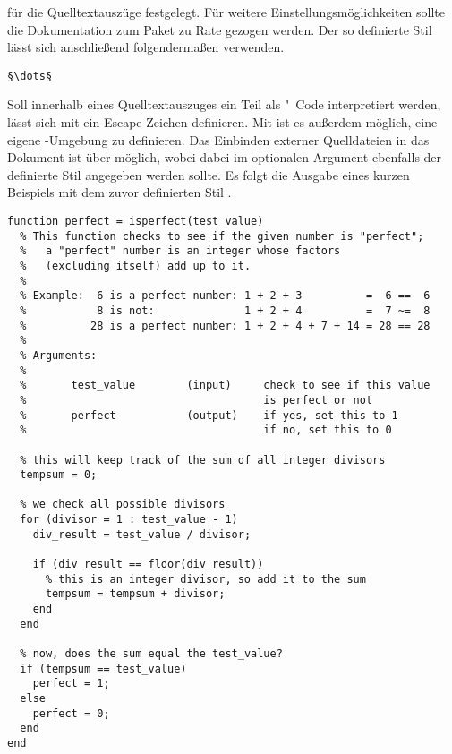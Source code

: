 \documentclass[%
  english,ngerman,%
  cdgeometry=no,DIV=12,automark,%
]{tudscrartcl}
\begin{document}
für die Quelltextauszüge festgelegt. Für weitere Einstellungsmöglichkeiten 
sollte die Dokumentation zum Paket zu Rate gezogen werden. Der so definierte 
Stil lässt sich anschließend folgendermaßen verwenden.
%
\begin{Hint}
\begin{lstlisting}[style=matlab]
§\dots§
\end{lstlisting}
\end{Hint}
%
Soll innerhalb eines Quelltextauszuges ein Teil als "~Code 
interpretiert werden, lässt sich mit  ein Escape-Zeichen 
definieren. Mit  ist es außerdem möglich, eine eigene 
-Umgebung zu definieren. Das Einbinden externer Quelldateien 
in das Dokument ist über 
möglich, wobei dabei im optionalen Argument ebenfalls der definierte Stil 
angegeben werden sollte. Es folgt die Ausgabe eines kurzen Beispiels mit dem 
zuvor definierten Stil .
%
\begin{lstlisting}[style=matlab]
function perfect = isperfect(test_value)
  % This function checks to see if the given number is "perfect";
  %   a "perfect" number is an integer whose factors 
  %   (excluding itself) add up to it.
  %
  % Example:  6 is a perfect number: 1 + 2 + 3          =  6 ==  6
  %           8 is not:              1 + 2 + 4          =  7 ~=  8
  %          28 is a perfect number: 1 + 2 + 4 + 7 + 14 = 28 == 28
  %
  % Arguments:
  %
  %       test_value        (input)     check to see if this value 
  %                                     is perfect or not
  %       perfect           (output)    if yes, set this to 1
  %                                     if no, set this to 0
  
  % this will keep track of the sum of all integer divisors
  tempsum = 0;
  
  % we check all possible divisors
  for (divisor = 1 : test_value - 1)
    div_result = test_value / divisor;
    
    if (div_result == floor(div_result)) 
      % this is an integer divisor, so add it to the sum
      tempsum = tempsum + divisor;
    end
  end
  
  % now, does the sum equal the test_value?
  if (tempsum == test_value) 
    perfect = 1;
  else
    perfect = 0;
  end
end
\end{lstlisting}
\end{document}
